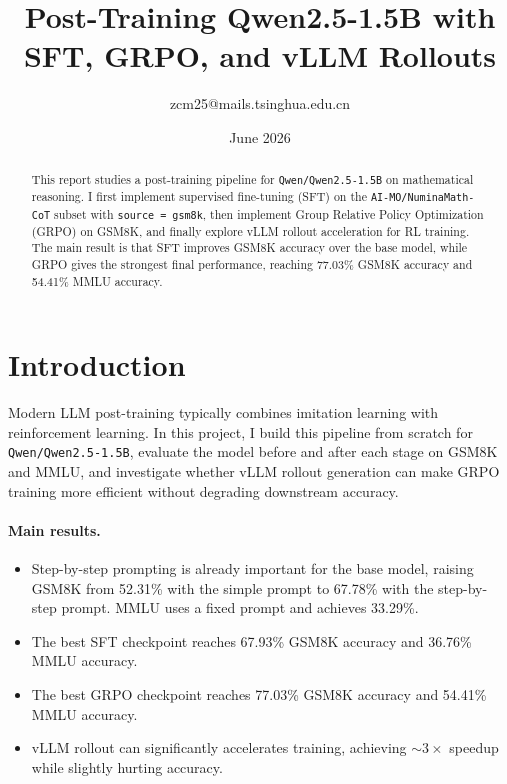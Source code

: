 \documentclass[11pt]{article}
\title{Post-Training Qwen2.5-1.5B with SFT, GRPO, and vLLM Rollouts}
\author{zcm25@mails.tsinghua.edu.cn}
\date{June 2026}
\begin{document}
\maketitle

\begin{abstract}
This report studies a post-training pipeline for \texttt{Qwen/Qwen2.5-1.5B} on mathematical reasoning. I first implement supervised fine-tuning (SFT) on the \texttt{AI-MO/NuminaMath-CoT} subset with \texttt{source = gsm8k}, then implement Group Relative Policy Optimization (GRPO) on GSM8K, and finally explore vLLM rollout acceleration for RL training. The main result is that SFT improves GSM8K accuracy over the base model, while GRPO gives the strongest final performance, reaching 77.03\% GSM8K accuracy and 54.41\% MMLU accuracy.
\end{abstract}

\section{Introduction}
Modern LLM post-training typically combines imitation learning with reinforcement learning. In this project, I build this pipeline from scratch for \texttt{Qwen/Qwen2.5-1.5B}, evaluate the model before and after each stage on GSM8K and MMLU, and investigate whether vLLM rollout generation can make GRPO training more efficient without degrading downstream accuracy.

\paragraph{Main results.}
\begin{itemize}
    \item Step-by-step prompting is already important for the base model, raising GSM8K from 52.31\% with the simple prompt to 67.78\% with the step-by-step prompt. MMLU uses a fixed prompt and achieves 33.29\%.
    \item The best SFT checkpoint reaches 67.93\% GSM8K accuracy and 36.76\% MMLU accuracy.
    \item The best GRPO checkpoint reaches 77.03\% GSM8K accuracy and 54.41\% MMLU accuracy.
    \item vLLM rollout can significantly accelerates training, achieving \(\sim 3\times\) speedup while slightly hurting accuracy.
\end{itemize}
\end{document}
